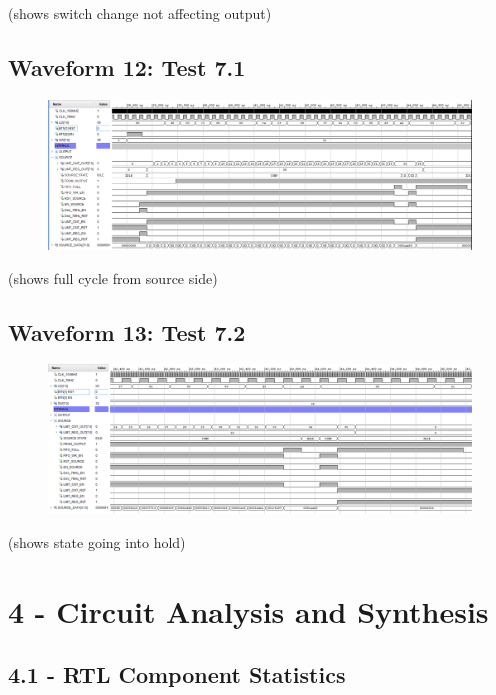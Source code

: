 \documentclass[11pt]{report}
\begin{document}
(shows switch change not affecting output)

\subsection*{Waveform 12: Test 7.1 }
\begin{figure}[H]
       \includegraphics[width=\columnwidth]{Assets/Test7_1.png}
\end{figure}

(shows full cycle from source side)

\subsection*{Waveform 13: Test 7.2 }
\begin{figure}[H]
       \includegraphics[width=\columnwidth]{Assets/Test7_2.png}
\end{figure}

(shows state going into hold)

\section*{4 - Circuit Analysis and Synthesis}

\subsection*{4.1 - RTL Component Statistics}
\end{document}
